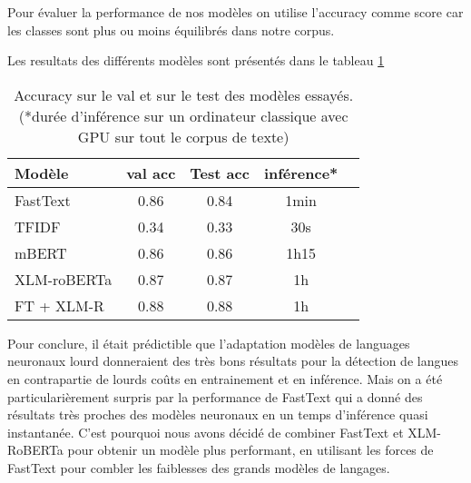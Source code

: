 
Pour évaluer la performance de nos modèles on utilise l'accuracy comme score car les classes sont plus ou moins équilibrés dans notre corpus.

Les resultats des différents modèles sont présentés dans le tableau \ref{tab:results}

\begin{table}[ht]
    \centering
    \begin{tabular}{lcccc}
        \toprule
        Modèle & val acc & Test acc  & inférence* \\
        \midrule
        FastText & 0.86 & 0.84 & 1min \\
        TFIDF & 0.34 & 0.33 & 30s \\
        mBERT & 0.86 & 0.86 & 1h15 \\
        XLM-roBERTa & 0.87 & 0.87 & 1h \\
        FT + XLM-R & 0.88 & 0.88 & 1h \\
        \bottomrule
    \end{tabular}

    \caption{Accuracy sur le val et sur le test des modèles essayés. (*durée d'inférence sur un ordinateur classique avec GPU sur tout le corpus de texte)}
    
    \label{tab:results}
\end{table}

Pour conclure, il était prédictible que l'adaptation modèles de languages neuronaux lourd donneraient des très bons résultats pour la détection de langues en contrapartie de lourds coûts en entrainement et en inférence. Mais on a été particularièrement surpris par la performance de FastText qui a donné des résultats très proches des modèles neuronaux en un temps d'inférence quasi instantanée. C'est pourquoi nous avons décidé de combiner FastText et XLM-RoBERTa pour obtenir un modèle plus performant, en utilisant les forces de FastText pour combler les faiblesses des grands modèles de langages.